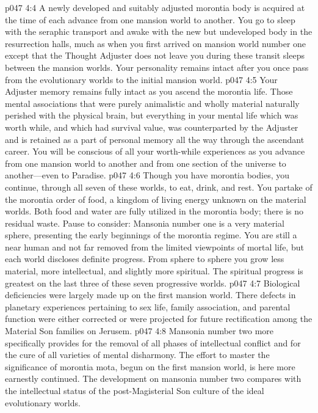 \vs p047 4:4 A newly developed and suitably adjusted morontia body is acquired at the time of each advance from one mansion world to another. You go to sleep with the seraphic transport and awake with the new but undeveloped body in the resurrection halls, much as when you first arrived on mansion world number one except that the Thought Adjuster does not leave you during these transit sleeps between the mansion worlds. Your personality remains intact after you once pass from the evolutionary worlds to the initial mansion world.
\vs p047 4:5 Your Adjuster memory remains fully intact as you ascend the morontia life. Those mental associations that were purely animalistic and wholly material naturally perished with the physical brain, but everything in your mental life which was worth while, and which had survival value, was counterparted by the Adjuster and is retained as a part of personal memory all the way through the ascendant career. You will be conscious of all your worth\hyp{}while experiences as you advance from one mansion world to another and from one section of the universe to another---even to Paradise.
\vs p047 4:6 Though you have morontia bodies, you continue, through all seven of these worlds, to eat, drink, and rest. You partake of the morontia order of food, a kingdom of living energy unknown on the material worlds. Both food and water are fully utilized in the morontia body; there is no residual waste. Pause to consider: Mansonia number one is a very material sphere, presenting the early beginnings of the morontia regime. You are still a near human and not far removed from the limited viewpoints of mortal life, but each world discloses definite progress. From sphere to sphere you grow less material, more intellectual, and slightly more spiritual. The spiritual progress is greatest on the last three of these seven progressive worlds.
\vs p047 4:7 Biological deficiencies were largely made up on the first mansion world. There defects in planetary experiences pertaining to sex life, family association, and parental function were either corrected or were projected for future rectification among the Material Son families on Jerusem.
\vs p047 4:8 Mansonia number two more specifically provides for the removal of all phases of intellectual conflict and for the cure of all varieties of mental disharmony. The effort to master the significance of morontia mota, begun on the first mansion world, is here more earnestly continued. The development on mansonia number two compares with the intellectual status of the post\hyp{}Magisterial Son culture of the ideal evolutionary worlds.
